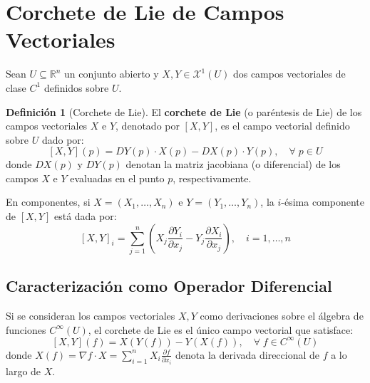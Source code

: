 \documentclass[11pt,a4paper]{article}
\theoremstyle{definition}
\newtheorem{definicion}{Definición}[section]
\theoremstyle{plain}
\theoremstyle{remark}
\begin{document}
	\section*{Corchete de Lie de Campos Vectoriales}
	
	Sean $U \subseteq \mathbb{R}^n$ un conjunto abierto y $X, Y \in \mathcal{X}^1(U)$ dos campos vectoriales de clase $C^1$ definidos sobre $U$.
	
	\begin{definicion}[Corchete de Lie]
		El \textbf{corchete de Lie} (o paréntesis de Lie) de los campos vectoriales $X$ e $Y$, denotado por $[X, Y]$, es el campo vectorial definido sobre $U$ dado por:
		\[
		[X, Y](p) = D Y(p) \cdot X(p) - D X(p) \cdot Y(p), \quad \forall \; p \in U
		\]
		donde $D X(p)$ y $D Y(p)$ denotan la matriz jacobiana (o diferencial) de los campos $X$ e $Y$ evaluadas en el punto $p$, respectivamente.
		
		En componentes, si $X = (X_1, \dots, X_n)$ e $Y = (Y_1, \dots, Y_n)$, la $i$-ésima componente de $[X, Y]$ está dada por:
		\[
		[X, Y]_i = \sum_{j=1}^n \left( X_j \frac{\partial Y_i}{\partial x_j} - Y_j \frac{\partial X_i}{\partial x_j} \right), \quad i = 1, \dots, n
		\]
	\end{definicion}
	
	\subsection*{Caracterización como Operador Diferencial}
	
	Si se consideran los campos vectoriales $X, Y$ como derivaciones sobre el álgebra de funciones $C^\infty(U)$, el corchete de Lie es el único campo vectorial que satisface:
	\[
	[X, Y](f) = X(Y(f)) - Y(X(f)), \quad \forall \; f \in C^\infty(U)
	\]
	donde $X(f) = \nabla f \cdot X = \sum_{i=1}^n X_i \frac{\partial f}{\partial x_i}$ denota la derivada direccional de $f$ a lo largo de $X$.
	
\end{document}
